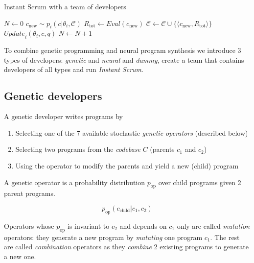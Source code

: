 \begin{algorithm}[H]
\begin{algorithmic}[1]
\caption{Instant Scrum with a team of developers}
\label{alg:instantscrum}
\State $N \gets 0$
\State $c_\text{new}\sim p_i(c | \theta_i, \mathcal{C})$ 
\State $R_\text{tot} \gets \mathit{Eval}(c_\text{new})$
\State $\mathcal{C} \gets \mathcal{C} \cup \{\langle c_\text{new}, R_\text{tot} \rangle\}$
\State $\mathit{Update}_i(\theta_i, c, q)$
\State $N \gets N+1$
\EndFor
\EndWhile
\EndProcedure
\end{algorithmic}
\end{algorithm}

To combine genetic programming and neural program synthesis we introduce 3 types of developers: \emph{genetic} and \emph{neural} and \emph{dummy}, create a team that contains developers of all types and run \emph{Instant Scrum}.

\newpage \subsection{Genetic developers}
\label{sec:genetic}


A genetic developer writes programs by
\begin{enumerate}
    \item Selecting one of the 7 available stochastic \emph{genetic operators} (described below)
    \item Selecting two programs from the \emph{codebase} $C$ (parents $c_1$ and $c_2$) 
    \item Using the operator to modify the parents and yield a new (child) program
\end{enumerate}

A genetic operator is a probability distribution $p_\text{op}$ over child programs given 2 parent programs. 

\begin{equation}
    p_\text{op}(c_\text{child}|c_1,c_2)
\end{equation}

Operators whose $p_\text{op}$ is invariant to $c_2$ and depends on $c_1$ only are called \emph{mutation} operators: they generate a new program by \emph{mutating} one program $c_1$.
The rest are called \emph{combination} operators as they \emph{combine} 2 existing programs to generate a new one.



